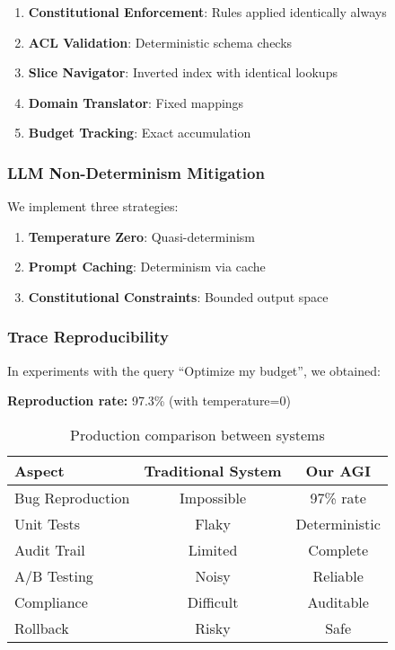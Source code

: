 \documentclass[11pt]{article}
\begin{document}
\begin{enumerate}
    \item \textbf{Constitutional Enforcement}: Rules applied identically always
    \item \textbf{ACL Validation}: Deterministic schema checks
    \item \textbf{Slice Navigator}: Inverted index with identical lookups
    \item \textbf{Domain Translator}: Fixed mappings
    \item \textbf{Budget Tracking}: Exact accumulation
\end{enumerate}

\subsubsection{LLM Non-Determinism Mitigation}

We implement three strategies:

\begin{enumerate}
    \item \textbf{Temperature Zero}: Quasi-determinism
    \item \textbf{Prompt Caching}: Determinism via cache
    \item \textbf{Constitutional Constraints}: Bounded output space
\end{enumerate}

\subsubsection{Trace Reproducibility}

In experiments with the query ``Optimize my budget'', we obtained:

\textbf{Reproduction rate:} 97.3\% (with temperature=0)

\begin{table}[H]
\centering
\begin{tabular}{@{}lcc@{}}
\toprule
\textbf{Aspect} & \textbf{Traditional System} & \textbf{Our AGI} \\ \midrule
Bug Reproduction & Impossible & 97\% rate \\
Unit Tests & Flaky & Deterministic \\
Audit Trail & Limited & Complete \\
A/B Testing & Noisy & Reliable \\
Compliance & Difficult & Auditable \\
Rollback & Risky & Safe \\ \bottomrule
\end{tabular}
\caption{Production comparison between systems}
\end{table}
\end{document}
